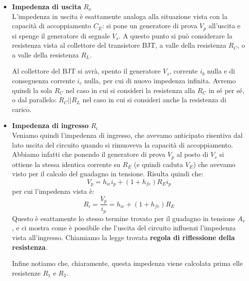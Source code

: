 \documentclass[a4paper,11pt]{article}
\begin{document}
\begin{itemize}
\item \textbf{\textsf{Impedenza di uscita}} $R_o$ \\
L'impedenza in uscita è esattamente analoga alla situazione vista con la capacità di accoppiamento $C_E$: si pone un generatore di prova $V_p$ all'uscita e si spenge il generatore di segnale $V_s$. A questo punto si può considerare la resistenza vista al collettore del transistore BJT, a valle della resistenza $R_C$, o a valle della resistenza $R_L$.

Al collettore del BJT si avrà, spento il generatore $V_s$, corrente $i_b$ nulla e di conseguenza corrente $i_c$ nulla, per cui di nuovo impedenza infinita.
Avremo quindi la sola $R_C$ nel caso in cui si consideri la resistenza alla $R_C$ in sé per sé, o dal parallelo: $R_C || R_L$ nel caso in cui si consideri anche la resistenza di carico.

\item \textbf{\textsf{Impedenza di ingresso}} $R_i$ \\
Veniamo quindi l'impedenza di ingresso, che avevamo anticipato risentiva dal lato uscita del circuito quando si rimuoveva la capacità di accoppiamento. Abbiamo infatti che ponendo il generatore di prova $V_p$ al posto di $V_s$ si ottiene la stessa identica corrente su $R_E$ (e quindi caduta $V_E$) che avevamo visto per il calcolo del guadagno in tensione. Risulta quindi che:
$$
V_p = h_{ie} i_p + (1 + h_{fe}) R_E i_p
$$
per cui l'impedenza vista è:
$$
R_i = \frac{V_p}{i_p} = h_{ie} + (1 + h_{fe}) R_E
$$
Questo è esattamente lo stesso termine trovato per il guadagno in tensione $A_v$, e ci mostra come è possibile che l'uscita del circuito influenzi l'impedenza vista all'ingresso. Chiamiamo la legge trovata \textbf{regola di riflessione della resistenza}. 

Infine notiamo che, chiaramente, questa impedenza viene calcolata prima elle resistenze $R_1$ e $R_2$. 

\end{itemize}
\end{document}
